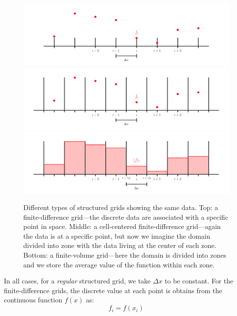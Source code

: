\begin{figure}[t]
\centering
\includegraphics[width=\linewidth]{fd_grid} \\
\includegraphics[width=\linewidth]{ccfd_grid} \\
\includegraphics[width=\linewidth]{fv_grid}
\caption[Types of structured grids]{\label{fig:grids} Different types of structured grids showing
  the same data.  Top:
  a finite-difference grid---the discrete data are associated with a
  specific point in space.  Middle: a cell-centered finite-difference
  grid---again the data is at a specific point, but now we imagine the
  domain divided into zone with the data living at the center of each
  zone.  Bottom: a finite-volume grid---here the domain is divided
  into zones and we store the average value of the function within
  each zone.}
\end{figure}

In all cases, for a {\em regular} structured grid, we take $\Delta x$
to be constant.  For the finite-difference grids, the discrete value at
each point is obtains from the continuous function $f(x)$ as:
\begin{equation}
f_i = f(x_i)
\end{equation}


